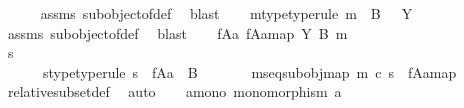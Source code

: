 \begin{isabellebody}
\ \ \ \ \isamarkupfalse%
\ assms{\isacharparenleft}{\kern0pt}{}{\isacharparenright}{\kern0pt}\ subobject{\isacharunderscore}{\kern0pt}of{\isacharunderscore}{\kern0pt}def{}\ \isamarkupfalse%
\ blast\isanewline
\ \ \isamarkupfalse%
\ m{\isacharunderscore}{\kern0pt}type{\isacharbrackleft}{\kern0pt}type{\isacharunderscore}{\kern0pt}rule{\isacharbrackright}{\kern0pt}{\isacharcolon}{\kern0pt}\ {\isachardoublequoteopen}m\ {\isacharcolon}{\kern0pt}\ B\ \ {\isasymrightarrow}\ Y{\isachardoublequoteclose}\isanewline
\ \ \ \ \isamarkupfalse%
\ assms{\isacharparenleft}{\kern0pt}{}{\isacharparenright}{\kern0pt}\ subobject{\isacharunderscore}{\kern0pt}of{\isacharunderscore}{\kern0pt}def{}\ \isamarkupfalse%
\ blast\isanewline
\isanewline
\ \ \isamarkupfalse%
\ {\isachardoublequoteopen}{\isacharparenleft}{\kern0pt}f{\isasymlparr}A{\isasymrparr}\isactrlbsub a\isactrlesub {\isacharcomma}{\kern0pt}\ {\isacharbrackleft}{\kern0pt}f{\isasymlparr}A{\isasymrparr}\isactrlbsub a\isactrlesub {\isacharbrackright}{\kern0pt}map{\isacharparenright}{\kern0pt}\ {\isasymsubseteq}\isactrlbsub Y\isactrlesub \ {\isacharparenleft}{\kern0pt}B{\isacharcomma}{\kern0pt}\ m{\isacharparenright}{\kern0pt}{\isachardoublequoteclose}\isanewline
\ \ \isamarkupfalse%
\ \isamarkupfalse%
\ s\ \ \ \ \ \ \ \ \ \ \ \ \ \ \ \ \ \ \ \ \ \ \ \ \ \ \ \ \ \ \ \ \ \ \ \ \ \ \ \ \ \ \ \ \ \ \isanewline
\ \ \ \ \ \ s{\isacharunderscore}{\kern0pt}type{\isacharbrackleft}{\kern0pt}type{\isacharunderscore}{\kern0pt}rule{\isacharbrackright}{\kern0pt}{\isacharcolon}{\kern0pt}\ {\isachardoublequoteopen}s\ {\isacharcolon}{\kern0pt}\ f{\isasymlparr}A{\isasymrparr}\isactrlbsub a\isactrlesub \ {\isasymrightarrow}\ B{\isachardoublequoteclose}\ \isanewline
\ \ \ \ \ \ m{\isacharunderscore}{\kern0pt}s{\isacharunderscore}{\kern0pt}eq{\isacharunderscore}{\kern0pt}subobj{\isacharunderscore}{\kern0pt}map{\isacharcolon}{\kern0pt}\ {\isachardoublequoteopen}m\ {\isasymcirc}\isactrlsub c\ s\ {\isacharequal}{\kern0pt}\ {\isacharbrackleft}{\kern0pt}f{\isasymlparr}A{\isasymrparr}\isactrlbsub a\isactrlesub {\isacharbrackright}{\kern0pt}map{\isachardoublequoteclose}\isanewline
\ \ \ \ \isamarkupfalse%
\ relative{\isacharunderscore}{\kern0pt}subset{\isacharunderscore}{\kern0pt}def{}\ \isamarkupfalse%
\ auto\isanewline
\isanewline
\ \ \isamarkupfalse%
\ a{\isacharunderscore}{\kern0pt}mono{\isacharcolon}{\kern0pt}\ {\isachardoublequoteopen}monomorphism\ a{\isachardoublequoteclose}\isanewline

\end{isabellebody}
